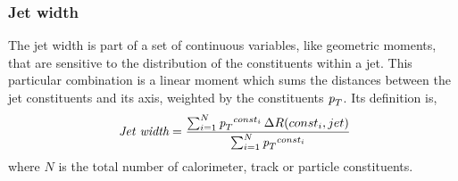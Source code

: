 


\subsubsection{Jet width} 

The jet width is part of a set of continuous variables, like geometric moments, that are sensitive to the distribution of the constituents within a jet.
This particular combination is a linear moment which sums the distances between the jet constituents and its axis, weighted by the constituents ${\emph{p}_{T}}$.  Its definition is,
%
\begin{equation} 
\mbox{ {\it Jet width}} = \frac{\sum_{i=1}^N {\emph{p}_{T}}^{const_i} \,\Delta R (const_i,jet) }{\sum_{i=1}^N {\emph{p}_{T}}^{const_i} }
\label{eqn:trackjetwidth}
\end{equation} 
%
where $N$ is the total number of calorimeter, track or particle constituents.  %

